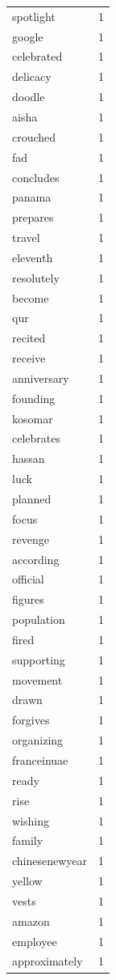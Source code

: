 \begin{tabular}{lr}
spotlight & 1 \\
google & 1 \\
celebrated & 1 \\
delicacy & 1 \\
doodle & 1 \\
aisha & 1 \\
crouched & 1 \\
fad & 1 \\
concludes & 1 \\
panama & 1 \\
prepares & 1 \\
travel & 1 \\
eleventh & 1 \\
resolutely & 1 \\
become & 1 \\
qur & 1 \\
recited & 1 \\
receive & 1 \\
anniversary & 1 \\
founding & 1 \\
kosomar & 1 \\
celebrates & 1 \\
hassan & 1 \\
luck & 1 \\
planned & 1 \\
focus & 1 \\
revenge & 1 \\
according & 1 \\
official & 1 \\
figures & 1 \\
population & 1 \\
fired & 1 \\
supporting & 1 \\
movement & 1 \\
drawn & 1 \\
forgives & 1 \\
organizing & 1 \\
franceinuae & 1 \\
ready & 1 \\
rise & 1 \\
wishing & 1 \\
family & 1 \\
chinesenewyear & 1 \\
yellow & 1 \\
vests & 1 \\
amazon & 1 \\
employee & 1 \\
approximately & 1 \\

\end{tabular}
